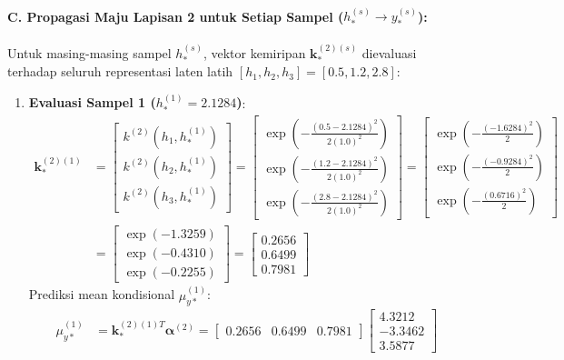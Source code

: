 \documentclass[11pt,a4paper]{article}
\begin{document}
\paragraph{C. Propagasi Maju Lapisan 2 untuk Setiap Sampel ($h_*^{(s)} \to y_*^{(s)}$):}
Untuk masing-masing sampel $h_*^{(s)}$, vektor kemiripan $\mathbf{k}_*^{(2)(s)}$ dievaluasi terhadap seluruh representasi laten latih $[h_1, h_2, h_3] = [0.5, 1.2, 2.8]$:

\begin{enumerate}
    \item \textbf{Evaluasi Sampel 1 ($h_*^{(1)} = 2.1284$)}:
    \begin{align}
    \mathbf{k}_*^{(2)(1)} &= \begin{bmatrix} k^{(2)}(h_1, h_*^{(1)}) \\ k^{(2)}(h_2, h_*^{(1)}) \\ k^{(2)}(h_3, h_*^{(1)}) \end{bmatrix} = \begin{bmatrix} \exp\left(-\frac{(0.5 - 2.1284)^2}{2(1.0)^2}\right) \\ \exp\left(-\frac{(1.2 - 2.1284)^2}{2(1.0)^2}\right) \\ \exp\left(-\frac{(2.8 - 2.1284)^2}{2(1.0)^2}\right) \end{bmatrix} = \begin{bmatrix} \exp\left(-\frac{(-1.6284)^2}{2}\right) \\ \exp\left(-\frac{(-0.9284)^2}{2}\right) \\ \exp\left(-\frac{(0.6716)^2}{2}\right) \end{bmatrix} \nonumber \\
    &= \begin{bmatrix} \exp(-1.3259) \\ \exp(-0.4310) \\ \exp(-0.2255) \end{bmatrix} = \begin{bmatrix} \mathbf{0.2656} \\ \mathbf{0.6499} \\ \mathbf{0.7981} \end{bmatrix}
    \end{align}
    Prediksi mean kondisional $\mu_{y*}^{(1)}$:
    \begin{align}
    \mu_{y*}^{(1)} &= \mathbf{k}_*^{(2)(1)T} \boldsymbol{\alpha}^{(2)} = \begin{bmatrix} 0.2656 & 0.6499 & 0.7981 \end{bmatrix} \begin{bmatrix} 4.3212 \\ -3.3462 \\ 3.5877 \end{bmatrix} \nonumber \\

\end{align}
\end{enumerate}
\end{document}
